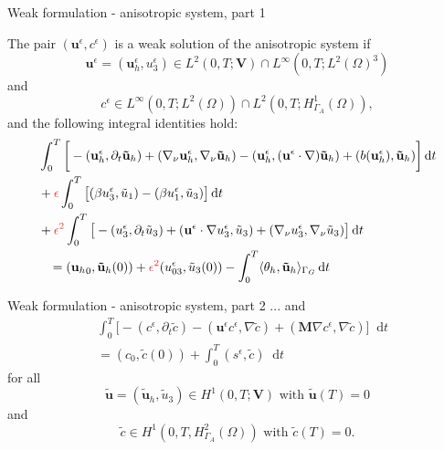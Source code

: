 \documentclass{beamer}
\newcommand*\diff{\mathop{}\!\mathrm{d}}
\begin{document}
\begin{frame}{Weak formulation - anisotropic system, part 1}

The pair $(\mathbf{u}^\epsilon, c^\epsilon)$ is a weak solution of the anisotropic system if
$$\mathbf{u}^\epsilon = (\mathbf{u}^\epsilon_h, u^\epsilon_3) \in L^2 (0,T ; \mathbf{V}) \cap L^\infty (0, T; L^2 (\Omega)^3)$$
and
$$c^\epsilon \in L^\infty (0,T; L^2(\Omega)) \cap L^2 (0,T; H^1_{\Gamma_A}(\Omega)),$$ and the following integral identities hold:
%
\begin{equation} \nonumber
\begin{split}
& \int_0^T \bigg [ -(\mathbf{u}^\epsilon_h, \partial_t \mathbf{\tilde{u}}_h) + (\nabla_\nu \mathbf{u}^\epsilon_h, \nabla_\nu \mathbf{\tilde{u}}_h) - (\mathbf{u}^\epsilon_h, (\mathbf{u}^\epsilon \cdot \nabla) \mathbf{\tilde{u}}_h) + (b(\mathbf{u}^\epsilon_h), \mathbf{\tilde{u}}_h) \bigg ] \diff t \\
& + \textcolor{jasper}{\epsilon} \int_0 ^ T \big [ (\beta u_3 ^\epsilon, \tilde{u}_1) - (\beta u_1^\epsilon, \tilde{u}_3) \big ] \diff t\\
& + \textcolor{jasper}{\epsilon^2} \int _0 ^ T \big [ -(u_3^\epsilon, \partial_t \tilde{u}_3) +(\mathbf{u}^\epsilon \cdot \nabla u_3 ^ \epsilon, \tilde{u}_3) + (\nabla_\nu u_3^\epsilon, \nabla_\nu \tilde{u}_3) \big ] \diff t \\
& \hspace{0.3cm} = ({\mathbf{u}_h}_0, \mathbf{\tilde{u}}_h(0)) + \textcolor{jasper}{\epsilon^2} (u_{03}^\epsilon, \tilde{u}_3 (0)) - \int_0^T \langle \theta_h, \mathbf{\tilde{u}}_h \rangle_{\Gamma_G} \diff t
\end{split}
\end{equation}

\end{frame}

\begin{frame}{Weak formulation - anisotropic system, part 2}
 ... and
%
\begin{equation} \nonumber
\begin{split}
& \int_0^T \bigg [ -(c^\epsilon, \partial_t \tilde{c}) -(\mathbf{u}^\epsilon c^\epsilon, \nabla \tilde{c}) + (\mathbf{M} \nabla c^\epsilon, \nabla \tilde{c}) \bigg ] \diff t \\
& =  (c_0, \tilde{c} (0)) + \int_0^T (s^\epsilon,\tilde{c}) \diff t
\end{split}
\end{equation}
%
for all
$$\mathbf{\tilde{u}} = (\mathbf{\tilde{u}}_h, \tilde{u}_3) \in H^1 (0,T;\mathbf{V}) \text{ with } \mathbf{\tilde{u}}(T) = 0$$ and $$\tilde{c} \in H^1 (0,T, H^2_{\Gamma_A} (\Omega)) \text{ with }\tilde{c} (T) = 0.$$
\end{frame}
\end{document}
